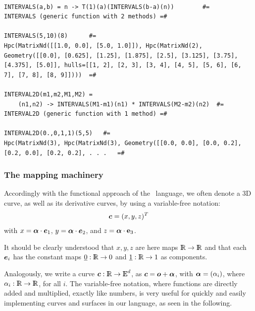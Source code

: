\begin{coding}[Algebraic computation of FE = $\delta_1$]
\begin{condition}[(3D curve]
\end{condition}

\begin{coding}[Toolbox]\
\begin{lstlisting}[language=JuliaLocal, style=julia, mathescape=true]
INTERVALS(a,b) = n -> T(1)(a)(INTERVALS(b-a)(n))		#=
INTERVALS (generic function with 2 methods)	=#

INTERVALS(5,10)(8)		#=
Hpc(MatrixNd([[1.0, 0.0], [5.0, 1.0]]), Hpc(MatrixNd(2), Geometry([[0.0], [0.625], [1.25], [1.875], [2.5], [3.125], [3.75], [4.375], [5.0]], hulls=[[1, 2], [2, 3], [3, 4], [4, 5], [5, 6], [6, 7], [7, 8], [8, 9]])))	=#

INTERVAL2D(m1,m2,M1,M2) = 
	(n1,n2) -> INTERVALS(M1-m1)(n1) * INTERVALS(M2-m2)(n2)	#=
INTERVAL2D (generic function with 1 method)	=#

INTERVAL2D(0.,0,1,1)(5,5)	#=
Hpc(MatrixNd(3), Hpc(MatrixNd(3), Geometry([[0.0, 0.0], [0.0, 0.2], [0.2, 0.0], [0.2, 0.2], . . . 	=#
\end{lstlisting}
\label{script:5:toolbox}
\end{coding}\vspace{3mm}



\subsubsection*{ The mapping machinery}\label{sect:5-3-2}
\label{sec:5:free}

Accordingly with the functional approach of the \pl\ language, we
often denote a 3D curve, as well as its derivative curves, by using
a variable-free notation:
\[
{\mbox{\boldmath $c$}} = (x,  y, z)^T
\]
with ${x} = {\mbox{\boldmath $\alpha$}} \cdot {\mbox{\boldmath $e$}}_{1}$, ${y} = {\mbox{\boldmath $\alpha$}} \cdot
{\mbox{\boldmath $e$}}_{2}$, and ${z} = {\mbox{\boldmath $\alpha$}} \cdot \mathbf{e}_{3}$.%

It should be clearly understood that $x, y, z$ %
are here maps $\mathbb{I\!\!R}\rightarrow\mathbb{I\!\!R}$ and that each ${\mbox{\boldmath $e$}}_{i}$ has the
constant maps $\underline{0}:\mathbb{I\!\!R}\rightarrow 0$ and
$\underline{1}:\mathbb{I\!\!R}\rightarrow 1$ as components.

Analogously, we write a curve ${\mbox{\boldmath $c$}}:\mathbb{I\!\!R}\rightarrow \mathbb{I\!\!E}^{d}$, as
${\mbox{\boldmath $c$}}={\mbox{\boldmath $o$}}+{\mbox{\boldmath $\alpha$}}$, with ${\mbox{\boldmath $\alpha$}}=(\alpha_{i})$, where
$\alpha_{i}: \mathbb{I\!\!R}\rightarrow\mathbb{I\!\!R}$, for all $i$.  The variable-free
notation, where functions are directly added and multiplied, exactly
like numbers, is very useful for quickly and easily implementing
curves and surfaces in our language, as seen in the following.


\end{coding}
